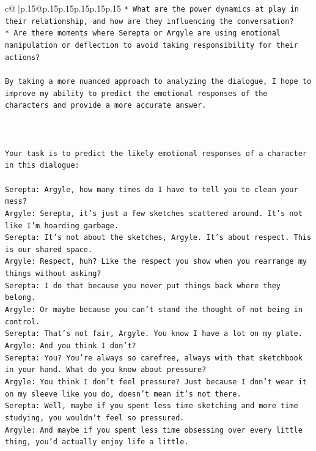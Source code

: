 \documentclass{article}
\begin{document}
{\begin{supertabular}{c@{$\;$}|p{.15\linewidth}@{}p{.15\linewidth}p{.15\linewidth}p{.15\linewidth}p{.15\linewidth}p{.15\linewidth}}
{{{\texttt{* What are the power dynamics at play in their relationship, and how are they influencing the conversation?} \\
\texttt{* Are there moments where Serepta or Argyle are using emotional manipulation or deflection to avoid taking responsibility for their actions?} \\
\\ 
\texttt{By taking a more nuanced approach to analyzing the dialogue, I hope to improve my ability to predict the emotional responses of the characters and provide a more accurate answer.} \\
\\ 
\\ 
\\ 
\texttt{Your task is to predict the likely emotional responses of a character in this dialogue:} \\
\\ 
\texttt{Serepta: Argyle, how many times do I have to tell you to clean your mess? } \\
\texttt{Argyle: Serepta, it's just a few sketches scattered around. It's not like I'm hoarding garbage.} \\
\texttt{Serepta: It's not about the sketches, Argyle. It's about respect. This is our shared space.} \\
\texttt{Argyle: Respect, huh? Like the respect you show when you rearrange my things without asking?} \\
\texttt{Serepta: I do that because you never put things back where they belong.} \\
\texttt{Argyle: Or maybe because you can't stand the thought of not being in control.} \\
\texttt{Serepta: That's not fair, Argyle. You know I have a lot on my plate.} \\
\texttt{Argyle: And you think I don't? } \\
\texttt{Serepta: You? You're always so carefree, always with that sketchbook in your hand. What do you know about pressure?} \\
\texttt{Argyle: You think I don't feel pressure? Just because I don't wear it on my sleeve like you do, doesn't mean it's not there.} \\
\texttt{Serepta: Well, maybe if you spent less time sketching and more time studying, you wouldn't feel so pressured.} \\
\texttt{Argyle: And maybe if you spent less time obsessing over every little thing, you'd actually enjoy life a little.} \\
}}}
\end{supertabular}}
\end{document}
